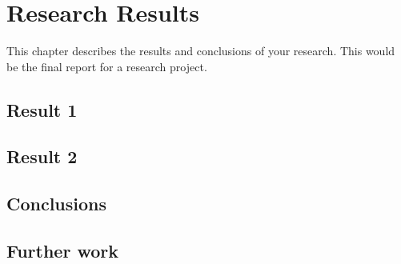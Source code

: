 

\chapter{Research Results}

This chapter describes the results and conclusions of your research.   This would be the final report for a research project.  

\section{Result 1}

\section{Result 2}

\section{Conclusions}

\section{Further work}  